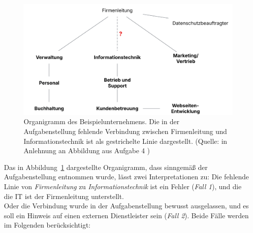 \begin{figure}
    \centering
    \includegraphics[scale=0.4]{aufgabe 4/img/organigramm.svg}
    \caption{Organigramm des Beispielunternehmens. Die in der Aufgabenstellung fehlende Verbindung zwischen Firmenleitung und Informationstechnik ist als gestrichelte Linie dargestellt. (Quelle: in Anlehnung an Abbildung aus Aufgabe 4 )}
    \label{fig:organigramm}
\end{figure}


\noindent
Das in Abbildung~\ref{fig:organigramm} dargestellte Organigramm, dass sinngemäß der Aufgabenstellung entnommen wurde, lässt zwei Interpretationen zu: Die fehlende Linie von \textit{Firmenleitung} zu \textit{Informationstechnik} ist ein Fehler (\textit{Fall 1}), und die die IT ist der Firmenleitung unterstellt.\\
Oder die Verbindung wurde in der Aufgabenstellung bewusst ausgelassen, und es soll ein Hinweis auf einen externen Dienstleister sein (\textit{Fall 2}).
Beide Fälle werden im Folgenden berücksichtigt:

